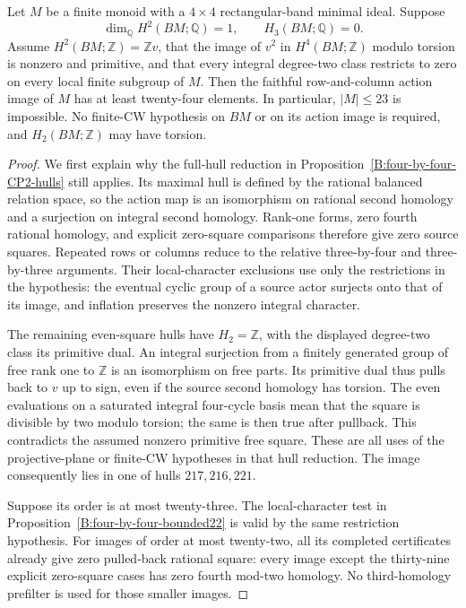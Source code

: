 \begin{proposition}
\label{B:four-by-four-finite-target-transfer}
Let $M$ be a finite monoid with a $4\times4$ rectangular-band
minimal ideal. Suppose
\[
 \dim_{\mathbb Q}H^2(BM;\mathbb Q)=1,
 \qquad H_3(BM;\mathbb Q)=0.
\]
Assume $H^2(BM;\mathbb Z)=\mathbb Zv$, that the image of $v^2$
in $H^4(BM;\mathbb Z)$ modulo torsion is nonzero and primitive,
and that every integral degree-two class restricts to zero on
every local finite subgroup of $M$.
Then the faithful row-and-column action image of $M$ has at
least twenty-four elements. In particular, $|M|\leq23$ is
impossible. No finite-CW hypothesis on $BM$ or on its action
image is required, and $H_2(BM;\mathbb Z)$ may have torsion.
\end{proposition}
\begin{proof}
We first explain why the full-hull reduction in
Proposition~\ref{B:four-by-four-CP2-hulls} still applies.
Its maximal hull is defined by the rational balanced relation
space, so the action map is an isomorphism on rational second
homology and a surjection on integral second homology.
Rank-one forms, zero fourth rational homology, and explicit
zero-square comparisons therefore give zero source squares.
Repeated rows or columns reduce to the relative three-by-four
and three-by-three arguments. Their local-character exclusions
use only the restrictions in the hypothesis: the eventual cyclic
group of a source actor surjects onto that of its image, and
inflation preserves the nonzero integral character.

The remaining even-square hulls have $H_2=\mathbb Z$, with the
displayed degree-two class its primitive dual. An integral
surjection from a finitely generated group of free rank one to
$\mathbb Z$ is an isomorphism on free parts. Its primitive dual
thus pulls back to $v$ up to sign, even if the source second
homology has torsion. The even evaluations on a saturated
integral four-cycle basis mean that the square is divisible by
two modulo torsion; the same is then true after pullback.
This contradicts the assumed nonzero primitive free square.
These are all uses of the projective-plane or finite-CW
hypotheses in that hull reduction. The image consequently lies
in one of hulls $217,216,221$.

Suppose its order is at most twenty-three. The local-character
test in Proposition~\ref{B:four-by-four-bounded22} is valid by
the same restriction hypothesis. For images of order at most
twenty-two, all its completed certificates already give zero
pulled-back rational square: every image except the thirty-nine
explicit zero-square cases has zero fourth mod-two homology.
No third-homology prefilter is used for those smaller images.


\end{proof}
